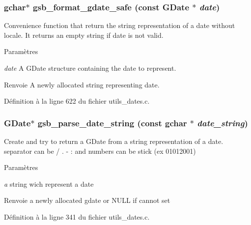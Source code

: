 \subsubsection[{gsb\_\-format\_\-gdate\_\-safe}]{\setlength{\rightskip}{0pt plus 5cm}gchar$\ast$ gsb\_\-format\_\-gdate\_\-safe (const GDate $\ast$ {\em date})}\label{utils__dates_8h_abe508780ddee49c70a49b509e731bb27}
Convenience function that return the string representation of a date without locale. It returns an empty string if date is not valid.


\begin{DoxyParams}{Paramètres}
\item[{\em date}]A GDate structure containing the date to represent.\end{DoxyParams}
\begin{DoxyReturn}{Renvoie}
A newly allocated string representing date. 
\end{DoxyReturn}


Définition à la ligne 622 du fichier utils\_\-dates.c.

\subsubsection[{gsb\_\-parse\_\-date\_\-string}]{\setlength{\rightskip}{0pt plus 5cm}GDate$\ast$ gsb\_\-parse\_\-date\_\-string (const gchar $\ast$ {\em date\_\-string})}\label{utils__dates_8h_a76c6dc10a356af3bd3a74738d41960a8}
Create and try to return a GDate from a string representation of a date. separator can be / . -\/ : and numbers can be stick (ex 01012001)


\begin{DoxyParams}{Paramètres}
\item[{\em a}]string wich represent a date\end{DoxyParams}
\begin{DoxyReturn}{Renvoie}
a newly allocated gdate or NULL if cannot set 
\end{DoxyReturn}


Définition à la ligne 341 du fichier utils\_\-dates.c.

